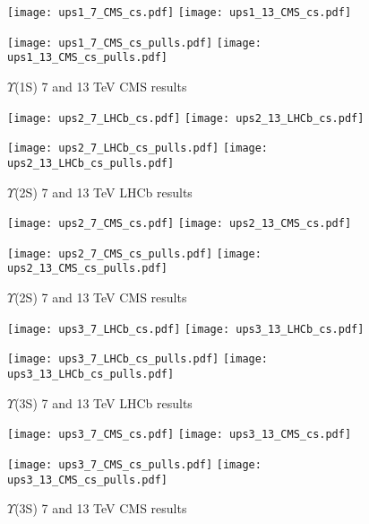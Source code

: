 \documentclass{article}
\begin{document}
\clearpage

\begin{figure}
\centering
\texttt{[image: ups1\_7\_CMS\_cs.pdf]}
\texttt{[image: ups1\_13\_CMS\_cs.pdf]}

\texttt{[image: ups1\_7\_CMS\_cs\_pulls.pdf]}
\texttt{[image: ups1\_13\_CMS\_cs\_pulls.pdf]}
\caption{$\Upsilon$(1S) 7 and 13 TeV CMS results}
\end{figure}

\clearpage

\begin{figure}
\centering
\texttt{[image: ups2\_7\_LHCb\_cs.pdf]}
\texttt{[image: ups2\_13\_LHCb\_cs.pdf]}

\texttt{[image: ups2\_7\_LHCb\_cs\_pulls.pdf]}
\texttt{[image: ups2\_13\_LHCb\_cs\_pulls.pdf]}
\caption{$\Upsilon$(2S) 7 and 13 TeV LHCb results}
\end{figure}

\clearpage

\begin{figure}
\centering
\texttt{[image: ups2\_7\_CMS\_cs.pdf]}
\texttt{[image: ups2\_13\_CMS\_cs.pdf]}

\texttt{[image: ups2\_7\_CMS\_cs\_pulls.pdf]}
\texttt{[image: ups2\_13\_CMS\_cs\_pulls.pdf]}
\caption{$\Upsilon$(2S) 7 and 13 TeV CMS results}
\end{figure}

\clearpage

\begin{figure}
\centering
\texttt{[image: ups3\_7\_LHCb\_cs.pdf]}
\texttt{[image: ups3\_13\_LHCb\_cs.pdf]}

\texttt{[image: ups3\_7\_LHCb\_cs\_pulls.pdf]}
\texttt{[image: ups3\_13\_LHCb\_cs\_pulls.pdf]}
\caption{$\Upsilon$(3S) 7 and 13 TeV LHCb results}
\end{figure}

\clearpage

\begin{figure}
\centering
\texttt{[image: ups3\_7\_CMS\_cs.pdf]}
\texttt{[image: ups3\_13\_CMS\_cs.pdf]}

\texttt{[image: ups3\_7\_CMS\_cs\_pulls.pdf]}
\texttt{[image: ups3\_13\_CMS\_cs\_pulls.pdf]}
\caption{$\Upsilon$(3S) 7 and 13 TeV CMS results}
\end{figure}

\clearpage
\restoregeometry


\end{document}
